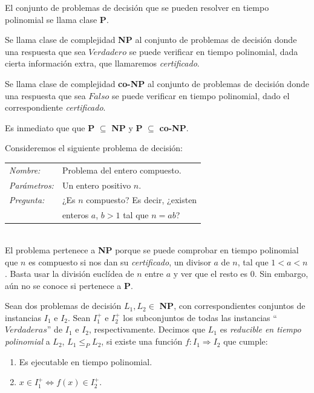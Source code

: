 \begin{definition}
	El conjunto de problemas de decisión que se pueden resolver en tiempo polinomial se llama clase \textbf{P}.
\end{definition}

\begin{definition}
	Se llama clase de complejidad \textbf{NP} al conjunto de problemas de decisión donde una respuesta que sea $Verdadero$ se puede verificar en tiempo polinomial, dada cierta información extra, que llamaremos \textit{certificado}.
\end{definition}

\begin{definition}
	Se llama clase de complejidad \textbf{co-NP} al conjunto de problemas de decisión donde una respuesta que sea $Falso$ se puede verificar en tiempo polinomial, dado el correspondiente \textit{certificado}.
\end{definition}

Es inmediato que  que \textbf{P} $\subseteq$ \textbf{NP} y \textbf{P} $\subseteq$ \textbf{co-NP}.

\begin{example}
	Consideremos el siguiente problema de decisión:
	
		\begin{tabular}{|ll}
		\textit{Nombre:} & Problema del entero compuesto. \\
		\textit{Parámetros:} & Un entero positivo $n$. \\
		\textit{Pregunta:} & ¿Es $n$ compuesto? Es decir, ¿existen \\
			&  enteros $a$, $b > 1$ tal que $n=ab$? \\
	\end{tabular}
	\\
	
	El problema pertenece a \textbf{NP} porque se puede comprobar en tiempo polinomial que $n$ es compuesto si nos dan su \textit{certificado}, un divisor $a$ de $n$, tal que $1 < a < n$. Basta usar la división euclídea de $n$ entre $a$ y ver que el resto es $0$. Sin embargo, aún no se conoce si pertenece a \textbf{P}.
\end{example}


\hfil

\begin{definition}
	Sean dos problemas de decisión $L_1, L_2 \in $ \textbf{NP}, con correspondientes conjuntos de instancias $I_1$ e $I_2$. Sean $I_1^+$ e $I_2^+$ los subconjuntos de todas las instancias ``$Verdaderas$'' de $I_1$ e $I_2$, respectivamente. Decimos que $L_1$ es \textit{reducible en tiempo polinomial} a $L_2$, $L_1 \leq_P L_2$, si existe una función $f:I_1 \Rightarrow I_2$ que cumple:
	
	\begin{enumerate}
		\item Es ejecutable en tiempo polinomial.
		\item $x \in I_1^+  \Leftrightarrow  f(x) \in I_2^+ $.
	\end{enumerate}
\end{definition}

